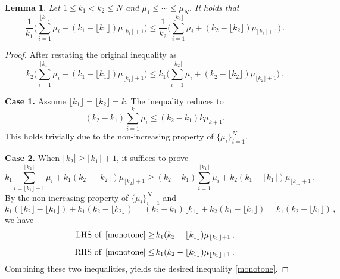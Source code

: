 \documentclass[12pt, twoside]{article}
\newtheorem{lemma}[theorem]{Lemma}
\theoremstyle{definition}
\numberwithin{equation}{section}
\begin{document}
\begin{lemma}\label{L1}
Let $1\leq k_{1}< k_{2}\leq N$ and $\mu_{1}\leq \cdots\leq \mu_{N}$. It holds that
\begin{equation*}
\frac{1}{k_{1}}\Big(\sum_{i=1}^{\lfloor k_{1} \rfloor}\mu_{i}+(k_1-\lfloor k_{1} \rfloor)\mu_{\lfloor k_{1} \rfloor+1} \Big)\leq  \frac{1}{k_{2}}\Big(\sum_{i=1}^{\lfloor k_{2} \rfloor}\mu_{i}+(k_2-\lfloor k_{2} \rfloor)\mu_{\lfloor k_{2} \rfloor+1} \Big)\,.
\end{equation*}
\end{lemma}\begin{proof}
After restating the original inequality as
\[
k_{2}\Big(\sum_{i=1}^{\lfloor k_{1} \rfloor}\mu_{i}+(k_1-\lfloor k_{1} \rfloor)\mu_{\lfloor k_{1} \rfloor+1} \Big)\leq  k_{1}\Big(\sum_{i=1}^{\lfloor k_{2} \rfloor}\mu_{i}+(k_2-\lfloor k_{2} \rfloor)\mu_{\lfloor k_{2} \rfloor+1} \Big)\,.\]

\noindent \textbf{Case 1.} Assume $\lfloor k_{1} \rfloor=\lfloor k_{2} \rfloor=k$. 
The inequality reduces to
\[
(k_2-k_1)\sum_{i=1}^{k}\mu_{i}\leq (k_2-k_{1})k\mu_{k+1}.
\]
This holds trivially due to the non-increasing property of $\{\mu_{i}\}_{i=1}^{N}$.\medskip

\noindent \textbf{Case 2.} When $\lfloor k_2]\geq \lfloor k_{1} \rfloor+1$, it suffices to prove
\begin{equation}\label{monotone}
k_{1}\sum_{i=\lfloor k_{1} \rfloor+1}^{\lfloor k_{2} \rfloor}\mu_{i}+k_{1}(k_2-\lfloor k_{2} \rfloor)\mu_{\lfloor k_{2} \rfloor+1}\geq (k_2-k_1)\sum_{i=1}^{\lfloor k_{1} \rfloor}\mu_{i}+k_{2}(k_1-\lfloor k_{1} \rfloor)\mu_{\lfloor k_{1} \rfloor+1}\,.
\end{equation}
By the non-increasing property of $\{\mu_{i}\}_{i=1}^{N}$ and
\[
k_{1}(\lfloor k_{2} \rfloor -\lfloor k_{1} \rfloor )+k_{1}(k_2-\lfloor k_{2} \rfloor)=(k_2-k_1)\lfloor k_{1} \rfloor+k_{2}(k_1-\lfloor k_{1} \rfloor)=k_1(k_2-\lfloor k_{1} \rfloor)\,,
\]
we have
\begin{align*}
\textrm{LHS of }\, \eqref{monotone}\geq & \, k_1(k_2-\lfloor k_{1} \rfloor)\mu_{\lfloor k_{1} \rfloor+1}\,,\\[2mm]
\textrm{RHS of }\, \eqref{monotone}\leq & \, k_1(k_2-\lfloor k_{1} \rfloor)\mu_{\lfloor k_{1} \rfloor+1}\,.
\end{align*}
Combining these two inequalities, yields the desired inequality \eqref{monotone}.
\end{proof}
\end{document}
